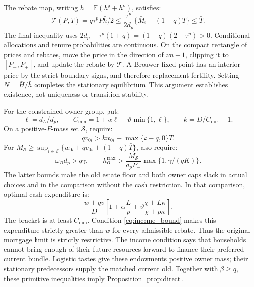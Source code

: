 \documentclass[11pt]{article}
\begin{document}
The rebate map, writing $\bar h=\mathbb E(h^y+h^o)$, satisfies:
\begin{equation}
\mathcal T(P,T)=q\tau^pP\bar h/2
\le\frac{\tau^p}{2d_p}\{\bar M_0+(1+q)T\}\le\bar T.
\end{equation}
The final inequality uses
$2d_p-\tau^p(1+q)=(1-q)(2-\tau^p)>0$.
Conditional allocations and tenure probabilities are continuous. On the
compact rectangle of prices and rebates, move the price in the direction of
$\nu\bar n-1$, clipping it to $[P_-,P_+]$, and update the rebate by
$\mathcal T$. A Brouwer fixed point has an interior price by the strict
boundary signs, and therefore replacement fertility. Setting
$N=\bar H/\bar h$ completes the stationary equilibrium. This argument
establishes existence, not uniqueness or transition stability.

For the constrained owner group, put:
\begin{equation}
\ell=d_L/d_p,\qquad C_{\min}=1+\alpha\ell+
\vartheta\min\{1,\ell\},\qquad k=D/C_{\min}-1.
\end{equation}
On a positive-$F$-mass set $\mathcal S$, require:
\begin{equation}
qv_{0i}>kw_{0i}+\max\{k-q,0\}\bar T.
\label{eq:income_bound}
\end{equation}
For $M_{\mathcal S}\ge\sup_{i\in\mathcal S}
\{w_{0i}+qv_{0i}+(1+q)\bar T\}$, also require:
\begin{equation}
\omega_Bd_p>q\gamma,\qquad
h_O^{\max}>\frac{M_{\mathcal S}}{d_pP_-}
\max\{1,\gamma/(qK)\}.
\label{eq:cap_bound}
\end{equation}
The latter bounds make the old estate floor and both owner caps slack in
actual choices and in the comparison without the cash restriction.
In that comparison, optimal cash expenditure is:
\begin{equation}
\frac{w+qv}{D}\left[1+\alpha\frac Lp+
\vartheta\frac{\chi+L\kappa}{\chi+p\kappa}\right].
\end{equation}
The bracket is at least $C_{\min}$. Condition \eqref{eq:income_bound} makes
this expenditure strictly greater than $w$ for every admissible rebate.
Thus the original mortgage limit is strictly restrictive. The income
condition says that households cannot bring enough of their future resources
forward to finance their preferred current bundle. Logistic tastes give
these endowments positive owner mass; their stationary predecessors supply
the matched current old. Together with $\beta\ge q$, these primitive
inequalities imply Proposition~\ref{prop:direct}.
\end{document}

